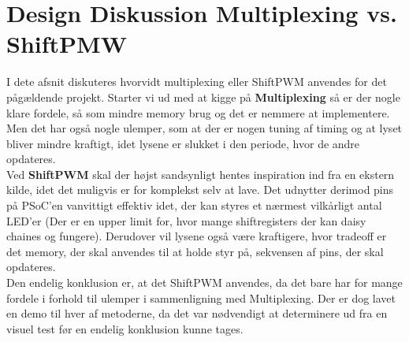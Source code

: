 \documentclass[Softwaredesign/Softwaredesign_main.tex]{subfiles}
\begin{document}
\section{Design Diskussion Multiplexing vs. ShiftPMW}
I dete afsnit diskuteres hvorvidt multiplexing eller ShiftPWM anvendes for det pågældende projekt. Starter vi ud med at kigge på \textbf{Multiplexing} så er der nogle klare fordele, så som mindre memory brug og det er nemmere at implementere. Men det har også nogle ulemper, som at der er nogen tuning af timing og at lyset bliver mindre kraftigt, idet lysene er slukket i den periode, hvor de andre opdateres.
\\Ved \textbf{ShiftPWM} skal der højst sandsynligt hentes inspiration ind fra en ekstern kilde, idet det muligvis er for komplekst selv at lave. Det udnytter derimod pins på PSoC'en vanvittigt effektiv idet, der kan styres et nærmest vilkårligt antal LED'er (Der er en upper limit for, hvor mange shiftregisters der kan daisy chaines og fungere). Derudover vil lysene også være kraftigere, hvor tradeoff er det memory, der skal anvendes til at holde styr på, sekvensen af pins, der skal opdateres.
\\Den endelig konklusion er, at det ShiftPWM anvendes, da det bare har for mange fordele i forhold til ulemper i sammenligning med Multiplexing. Der er dog lavet en demo til hver af metoderne, da det var nødvendigt at determinere ud fra en visuel test før en endelig konklusion kunne tages.
\end{document}
